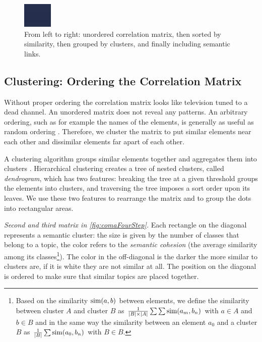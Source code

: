 \documentclass[10pt]{book}
\begin{document}
\begin{figure}[h]
  \includegraphics{clusteringEx}
  \caption{From left to right: unordered correlation matrix, then sorted by similarity, then grouped by clusters, and finally including semantic links.}\label{fig:comaFourStep}
\end{figure}

\subsection{Clustering: Ordering the Correlation Matrix}\label{sec:clustering}


Without proper ordering the correlation matrix looks like television tuned to a dead channel. An unordered matrix does not reveal any patterns. An arbitrary ordering, such as for example the names of the elements, is generally as useful as random ordering \cite{Bert73a}. Therefore, we cluster the matrix to put similar elements near each other and dissimilar elements far apart of each other.

A clustering algorithm groups similar elements together and aggregates them into clusters \cite{Jain99a}. Hierarchical clustering creates a tree of nested clusters, called \emph{dendrogram}, which has two features: breaking the tree at a given threshold groups the elements into clusters, and traversing the tree imposes a sort order upon its leaves. We use these two features to rearrange the matrix and to group the dots into rectangular areas.

\emph{Second and third matrix in \autoref{fig:comaFourStep}.} Each rectangle on the diagonal represents a semantic cluster: the size is given by the number of classes that belong to a topic, the color refers to the \emph{semantic cohesion} \cite{Marc05a} (\ie the average similarity among its classes\footnote{Based on the similarity ${\rm sim}(a,b)$ between elements, we define the similarity between cluster $A$ and cluster $B$ as $\frac{1}{|B| \times |A|}\sum \sum {\rm sim}(a_m,b_n)$ with $a \in A$ and $b \in B$ and in the same way the similarity between an element $a_0$ and a cluster $B$ as $\frac{1}{|B|}\sum {\rm sim}(a_0,b_n)$ with $B \in B$.
}). The color in the off-diagonal is the darker the more similar to clusters are, if it is white they are not similar at all. The position on the diagonal is ordered to make sure that similar topics are placed together.
\end{document}
